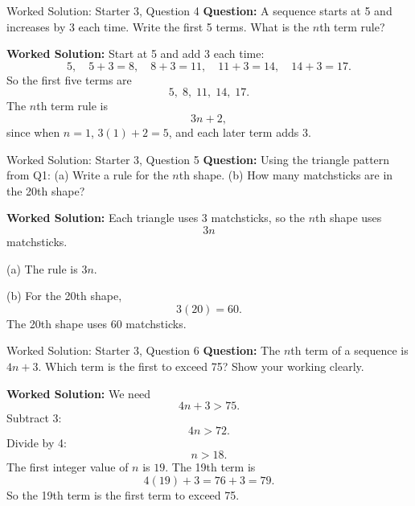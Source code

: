 \documentclass{beamer}
\begin{document}
\begin{frame}{Worked Solution: Starter 3, Question 4}
\textbf{Question:} A sequence starts at 5 and increases by 3 each time. Write the first 5 terms. What is the $n$th term rule?

\textbf{Worked Solution:} Start at 5 and add 3 each time:
\[
5,\quad 5+3=8,\quad 8+3=11,\quad 11+3=14,\quad 14+3=17.
\]
So the first five terms are
\[
5,\;8,\;11,\;14,\;17.
\]
The $n$th term rule is
\[
3n+2,
\]
since when $n=1$, $3(1)+2=5$, and each later term adds 3.
\end{frame}

\begin{frame}{Worked Solution: Starter 3, Question 5}
\textbf{Question:} Using the triangle pattern from Q1: (a) Write a rule for the $n$th shape. (b) How many matchsticks are in the 20th shape?

\textbf{Worked Solution:} Each triangle uses 3 matchsticks, so the $n$th shape uses
\[
3n
\]
matchsticks.

(a) The rule is $3n$.

(b) For the 20th shape,
\[
3(20)=60.
\]
The 20th shape uses 60 matchsticks.
\end{frame}

\begin{frame}{Worked Solution: Starter 3, Question 6}
\textbf{Question:} The $n$th term of a sequence is $4n+3$. Which term is the first to exceed 75? Show your working clearly.

\textbf{Worked Solution:} We need
\[
4n+3>75.
\]
Subtract 3:
\[
4n>72.
\]
Divide by 4:
\[
n>18.
\]
The first integer value of $n$ is $19$. The 19th term is
\[
4(19)+3=76+3=79.
\]
So the 19th term is the first term to exceed 75.
\end{frame}
\end{document}
